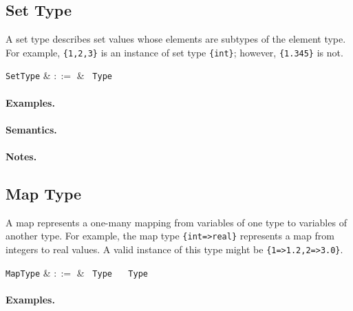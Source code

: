 \subsection{Set Type}

A set type describes set values whose elements are subtypes of the element type. For example, \lstinline|{1,2,3}| is an instance of set type \lstinline|{int}|; however, \lstinline|{1.345}| is not.

\begin{syntax}
  \verb+SetType+ & $::=$ & \token{\{} \ \verb+Type+ \ \token{\}} \\
\end{syntax}

\paragraph{Examples.}

\paragraph{Semantics.}

\paragraph{Notes.} 


\subsection{Map Type}

A map represents a one-many mapping from variables of one type to variables of another type. For example, the map type \lstinline|{int=>real}| represents a map from integers to real values. A valid instance of this type might be \lstinline|{1=>1.2,2=>3.0}|.

\begin{syntax}
  \verb+MapType+ & $::=$ & \token{\{} \ \verb+Type+ \ \token{=>} \ \verb+Type+ \ \token{\}} \\
\end{syntax}

\paragraph{Examples.}

